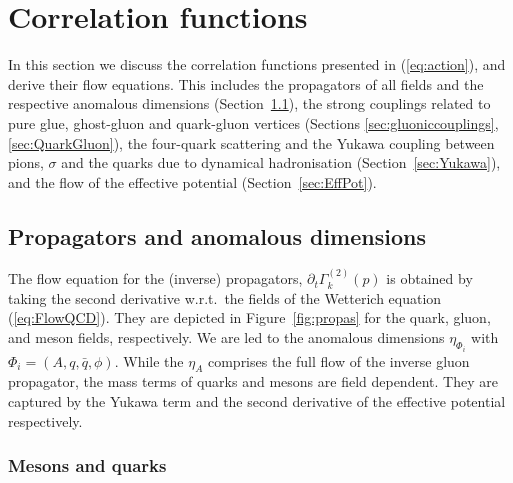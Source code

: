 \documentclass[%
reprint,
superscriptaddress,
showpacs,preprintnumbers,
 amsmath,amssymb,
 aps,
prd,
]{revtex4-1}
\def\Fig#1{Figure~\ref{#1}}
\def\eq#1{(\ref{#1})}
\def\sec#1{Section~\ref{#1}}
\begin{document}

\section{Correlation functions}
\label{sec:correlation}

In this section we discuss the correlation functions presented in
\eq{eq:action}, and derive their flow equations. This includes the
propagators of all fields and the respective anomalous dimensions
(\sec{sec:propa}), the strong couplings related to pure glue,
ghost-gluon and quark-gluon vertices (Sections
\ref{sec:gluoniccouplings}, \ref{sec:QuarkGluon}), the four-quark
scattering and the Yukawa coupling between pions, $\sigma$ and the
quarks due to dynamical hadronisation (\sec{sec:Yukawa}), and the flow
of the effective potential (\sec{sec:EffPot}).


\subsection{Propagators and anomalous dimensions}
\label{sec:propa}


The flow equation for the (inverse) propagators,
$\partial_t \Gamma^{(2)}_k(p)$ is obtained by taking the second
derivative w.r.t.\ the fields of the Wetterich equation
\eq{eq:FlowQCD}.  They are depicted in \Fig{fig:propas} for the quark,
gluon, and meson fields, respectively. We are led to the anomalous
dimensions $\eta_{\Phi_i}$ with $\Phi_i=(A,q,\bar q,\phi)$. While the
$\eta_A$ comprises the full flow of the inverse gluon propagator, the
mass terms of quarks and mesons are field dependent. They are captured
by the Yukawa term and the second derivative of the effective
potential respectively.


\subsubsection{Mesons and quarks}\label{sec:MatterProps}
\end{document}
